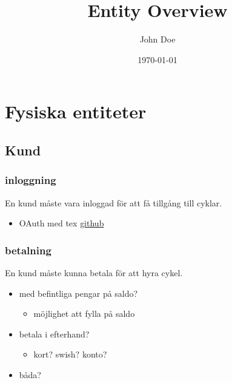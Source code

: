 \documentclass[11pt]{article}
\author{John Doe}
\date{\today}
\title{Entity Overview}
\begin{document}
\maketitle
\tableofcontents


\section{Fysiska entiteter}
\label{sec:org1adb97b}

\subsection{Kund}
\label{sec:orge805b47}

\subsubsection{inloggning}
\label{sec:orge5b5fc2}
En kund måste vara inloggad för att få tillgång till cyklar.
\begin{itemize}
\item OAuth med tex \href{https://docs.github.com/en/developers/apps/building-oauth-apps}{github}
\end{itemize}

\subsubsection{betalning}
\label{sec:org82fa810}
En kund måste kunna betala för att hyra cykel.
\begin{itemize}
\item med befintliga pengar på saldo?
\begin{itemize}
\item möjlighet att fylla på saldo
\end{itemize}
\item betala i efterhand?
\begin{itemize}
\item kort? swish? konto?
\end{itemize}
\item båda?
\end{itemize}
\end{document}
